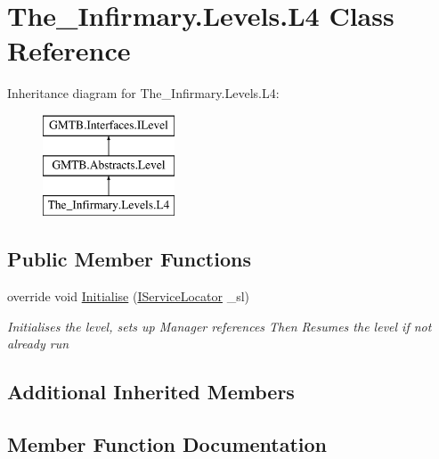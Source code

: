 \hypertarget{class_the___infirmary_1_1_levels_1_1_l4}{}\section{The\+\_\+\+Infirmary.\+Levels.\+L4 Class Reference}
\label{class_the___infirmary_1_1_levels_1_1_l4}
Inheritance diagram for The\+\_\+\+Infirmary.\+Levels.\+L4\+:\begin{figure}[H]
\begin{center}
\leavevmode
\includegraphics[height=3.000000cm]{class_the___infirmary_1_1_levels_1_1_l4}
\end{center}
\end{figure}
\subsection*{Public Member Functions}
\begin{DoxyCompactItemize}
\item 
override void \mbox{\hyperlink{class_the___infirmary_1_1_levels_1_1_l4_a50a15955ce03ea614a3fcc32df4672de}{Initialise}} (\mbox{\hyperlink{interface_g_m_t_b_1_1_interfaces_1_1_i_service_locator}{I\+Service\+Locator}} \+\_\+sl)
\begin{DoxyCompactList}\small\item\em Initialises the level, sets up Manager references Then Resumes the level if not already run \end{DoxyCompactList}\end{DoxyCompactItemize}
\subsection*{Additional Inherited Members}


\subsection{Member Function Documentation}
\mbox{\label{class_the___infirmary_1_1_levels_1_1_l4_a50a15955ce03ea614a3fcc32df4672de}} 
